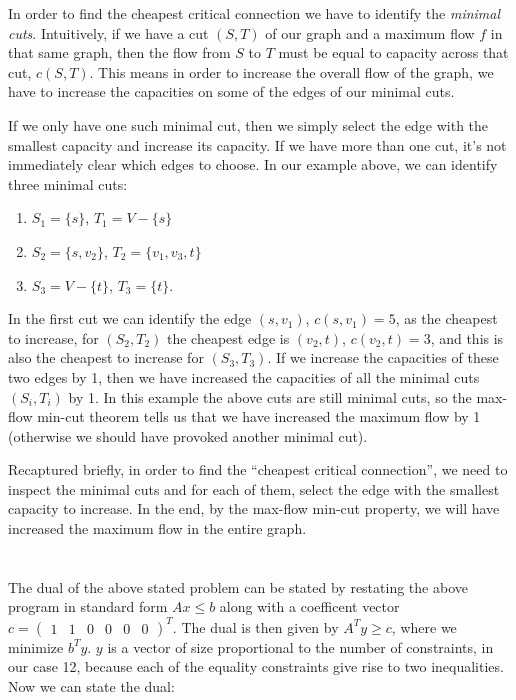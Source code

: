 \documentclass{article}
\begin{document}
In order to find the cheapest critical connection we have to identify
the \emph{minimal cuts}. Intuitively, if we have a cut $(S, T)$ of our
graph and a maximum flow $f$ in that same graph, then the flow from
$S$ to $T$ must be equal to capacity across that cut, $c(S,T)$. This
means in order to increase the overall flow of the graph, we have to
increase the capacities on some of the edges of our minimal cuts.

If we only have one such minimal cut, then we simply select the edge
with the smallest capacity and increase its capacity. If we have more
than one cut, it's not immediately clear which edges to choose.
In our example above, we can identify three minimal cuts:
\begin{enumerate}
  \item $S_1 = \{s\}$, $T_1 = V - \{s\}$
  \item $S_2 = \{s,v_2\}$, $T_2 = \{v_1,v_3,t \}$
  \item $S_3 = V - \{t\}$, $T_3 = \{t\}$.
\end{enumerate}

In the first cut we can identify the edge $(s, v_1)$, $c(s,v_1) = 5$,
as the cheapest to increase, for $(S_2,T_2)$ the cheapest edge is
$(v_2,t)$, $c(v_2,t) = 3$, and this is also the cheapest to increase
for $(S_3, T_3)$. If we increase the capacities of these two edges by
1, then we have increased the capacities of all the minimal cuts
$(S_i,T_i)$ by 1. In this example the above cuts are still minimal
cuts, so the max-flow min-cut theorem tells us that we have increased
the maximum flow by 1 (otherwise we should have provoked another
minimal cut).

Recaptured briefly, in order to find the ``cheapest critical
connection'', we need to inspect the minimal cuts and for each of
them, select the edge with the smallest capacity to increase. In the
end, by the max-flow min-cut property, we will have increased the
maximum flow in the entire graph.

\section*{\hfill}

The dual of the above stated problem can be stated by restating the
above program in standard form $Ax\leq b$ along with a coefficent
vector $c = \begin{pmatrix} 1 & 1 & 0 & 0 & 0 & 0\end{pmatrix}^T$. The
  dual is then given by $A^Ty \geq c$, where we minimize $b^Ty$. $y$
  is a vector of size proportional to the number of constraints, in
  our case 12, because each of the equality constraints give rise to
  two inequalities. Now we can state the dual:
\end{document}
